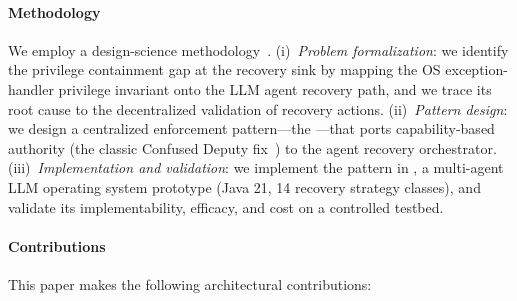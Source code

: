 \paragraph{Methodology}
We employ a design-science methodology~\cite{hevner2004design}. (i)~\emph{Problem formalization}: we identify the privilege containment gap at the recovery sink by mapping the OS exception-handler privilege invariant onto the LLM agent recovery path, and we trace its root cause to the decentralized validation of recovery actions. (ii)~\emph{Pattern design}: we design a centralized enforcement pattern---the \reauthgate{}---that ports capability-based authority (the classic Confused Deputy fix~\cite{hardy1988confused}) to the agent recovery orchestrator. (iii)~\emph{Implementation and validation}: we implement the pattern in \system{}, a multi-agent LLM operating system prototype (Java 21, 14 recovery strategy classes), and validate its implementability, efficacy, and cost on a controlled testbed.

\paragraph{Contributions}
This paper makes the following architectural contributions:

